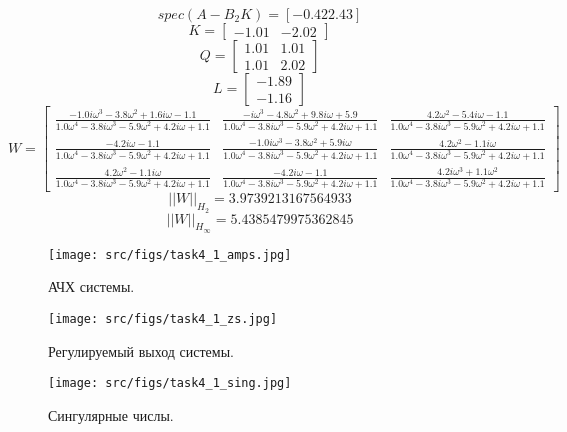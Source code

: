   \FloatBarrier
\[spec(A-B_2 K) = [-0.42  2.43]\]
\[K = \begin{bmatrix}
 -1.01 & -2.02
\end{bmatrix}\]
\[Q = \begin{bmatrix}
  1.01 &  1.01\\
  1.01 &  2.02
\end{bmatrix}\]
\[L = \begin{bmatrix}
 -1.89\\
 -1.16
\end{bmatrix}\]
\[ W = \left[\begin{matrix}\frac{- 1.0 i \omega^{3} - 3.8 \omega^{2} + 1.6 i \omega - 1.1}{1.0 \omega^{4} - 3.8 i \omega^{3} - 5.9 \omega^{2} + 4.2 i \omega + 1.1} & \frac{- i \omega^{3} - 4.8 \omega^{2} + 9.8 i \omega + 5.9}{1.0 \omega^{4} - 3.8 i \omega^{3} - 5.9 \omega^{2} + 4.2 i \omega + 1.1} & \frac{4.2 \omega^{2} - 5.4 i \omega - 1.1}{1.0 \omega^{4} - 3.8 i \omega^{3} - 5.9 \omega^{2} + 4.2 i \omega + 1.1}\\\frac{- 4.2 i \omega - 1.1}{1.0 \omega^{4} - 3.8 i \omega^{3} - 5.9 \omega^{2} + 4.2 i \omega + 1.1} & \frac{- 1.0 i \omega^{3} - 3.8 \omega^{2} + 5.9 i \omega}{1.0 \omega^{4} - 3.8 i \omega^{3} - 5.9 \omega^{2} + 4.2 i \omega + 1.1} & \frac{4.2 \omega^{2} - 1.1 i \omega}{1.0 \omega^{4} - 3.8 i \omega^{3} - 5.9 \omega^{2} + 4.2 i \omega + 1.1}\\\frac{4.2 \omega^{2} - 1.1 i \omega}{1.0 \omega^{4} - 3.8 i \omega^{3} - 5.9 \omega^{2} + 4.2 i \omega + 1.1} & \frac{- 4.2 i \omega - 1.1}{1.0 \omega^{4} - 3.8 i \omega^{3} - 5.9 \omega^{2} + 4.2 i \omega + 1.1} & \frac{4.2 i \omega^{3} + 1.1 \omega^{2}}{1.0 \omega^{4} - 3.8 i \omega^{3} - 5.9 \omega^{2} + 4.2 i \omega + 1.1}\end{matrix}\right]\]
\[||W||_{H_2} = 3.9739213167564933\]
\[||W||_{H_\infty} = 5.4385479975362845 \]

  \begin{figure}[ht!]
    \centering
    \texttt{[image: src/figs/task4\_1\_amps.jpg]}
    \caption{АЧХ системы.}
    \label{fig:task4_1_amps}
  \end{figure}
  
  \begin{figure}[ht!]
    \centering
    \texttt{[image: src/figs/task4\_1\_zs.jpg]}
    \caption{Регулируемый выход системы.}
    \label{fig:task4_1_zs}
  \end{figure}
  
  \begin{figure}[ht!]
    \centering
    \texttt{[image: src/figs/task4\_1\_sing.jpg]}
    \caption{Сингулярные числы.}
    \label{fig:task4_1_sing}
  \end{figure}

